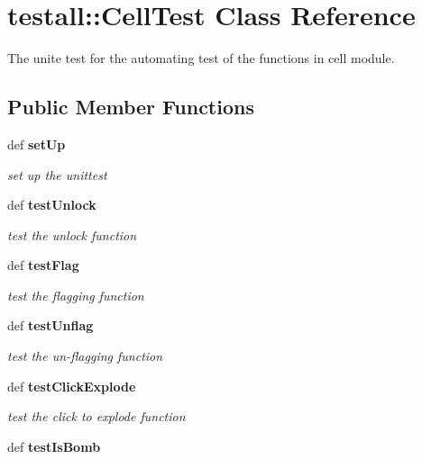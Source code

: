 \section{testall::Cell\-Test Class Reference}
\label{classtestall_1_1CellTest}
The unite test for the automating test of the functions in cell module.  


\subsection*{Public Member Functions}
\begin{CompactItemize}
\item 
def \bf{set\-Up}\label{classtestall_1_1CellTest_c25b698c0d8c8db863972f98997b937d}

\begin{CompactList}\small\item\em set up the unittest \item\end{CompactList}\item 
def \bf{test\-Unlock}\label{classtestall_1_1CellTest_c9b704e76bd2930aa2bdd948a855a72b}

\begin{CompactList}\small\item\em test the unlock function \item\end{CompactList}\item 
def \bf{test\-Flag}\label{classtestall_1_1CellTest_9efeaffe2f7ab0fa05d5c97439ebb451}

\begin{CompactList}\small\item\em test the flagging function \item\end{CompactList}\item 
def \bf{test\-Unflag}\label{classtestall_1_1CellTest_0198c9a7e33642b9773d8b769140a427}

\begin{CompactList}\small\item\em test the un-flagging function \item\end{CompactList}\item 
def \bf{test\-Click\-Explode}\label{classtestall_1_1CellTest_ecb02f3140a786980b11bacfd8166872}

\begin{CompactList}\small\item\em test the click to explode function \item\end{CompactList}\item 
def \bf{test\-Is\-Bomb}\label{classtestall_1_1CellTest_ec71ebe966cfe0d87f18cd1f16776224}


\end{CompactItemize}
